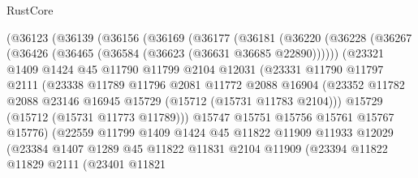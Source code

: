 \begin{lexlean}{RustCore}
\begin{coremodule}
            (@36123
              (@36139
                (@36156
                  (@36169
                    (@36177
                      (@36181
                        (@36220
                          (@36228
                            (@36267 (@36426 (@36465 (@36584 (@36623 (@36631 @36685 @22890))))))
                            (@23321
                              @1409
                              @1424
                              @45
                              @11790
                              @11799
                              @2104
                              @12031
                              (@23331
                                @11790
                                @11797
                                @2111
                                (@23338
                                  @11789
                                  @11796
                                  @2081
                                  @11772
                                  @2088
                                  @16904
                                  (@23352
                                    @11782
                                    @2088
                                    @23146
                                    @16945
                                    @15729
                                    (@15712 (@15731 @11783 @2104)))
                                  @15729
                                  (@15712 (@15731 @11773 @11789)))
                                @15747
                                @15751
                                @15756
                                @15761
                                @15767
                                @15776)
                              (@22559
                                @11799
                                @1409
                                @1424
                                @45
                                @11822
                                @11909
                                @11933
                                @12029
                                (@23384
                                  @1407
                                  @1289
                                  @45
                                  @11822
                                  @11831
                                  @2104
                                  @11909
                                  (@23394
                                    @11822
                                    @11829
                                    @2111
                                    (@23401
                                      @11821

\end{coremodule}
\end{lexlean}
